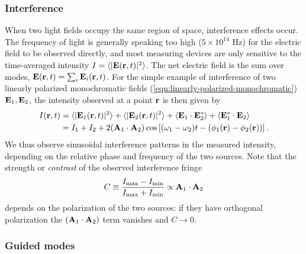 \subsubsection{Interference} 
\label{sec:interference}
When two light fields occupy the same region of space, interference effects occur. The frequency of light is generally speaking too high ($5\times10 ^{14}$ Hz) for the electric field to be observed directly, and most measuring devices are only sensitive to the time-averaged intensity $I= \langle | \mathbf{E}(\mathbf{r}, t) | ^2 \rangle$. 
The net electric field is the sum over modes, $\mathbf{E}(\mathbf{r}, t) = \sum_{i} \mathbf{E}_i(\mathbf{r}, t)$. For the simple example of interference of two linearly polarized monochromatic fields (\ref{eqn:linearly-polarized-monochromatic}) $\mathbf{E}_1, \mathbf{E}_2$, the intensity observed at a point $\mathbf{r}$ is then given by
\begin{align}
    I(\mathbf{r}, t) 
    &= 
    \langle |\mathbf{E}_1(\mathbf{r}, t)|^2 \rangle +  
    \langle |\mathbf{E}_2(\mathbf{r}, t)|^2 \rangle +
    \langle \mathbf{E}_1 \cdot \mathbf{E}_2^* \rangle +
    \langle \mathbf{E}_1^* \cdot \mathbf{E}_2 \rangle \\
    &= I_1 + I_2 + 2(\mathbf{A}_1 \cdot \mathbf{A}_2) 
    \cos \left[ (\omega_1 - \omega_2) t - (\phi_1(\mathbf{r}) - \phi_2(\mathbf{r}) ) \right].
    \label{eqn:reduced-contrast}
\end{align}
We thus observe sinusoidal interference patterns in the measured intensity, depending on the relative phase and frequency of the two sources. Note that the strength or \emph{contrast} of the observed interference fringe 
\begin{equation}
    C \equiv \frac{I_\mathrm{max} - I_\mathrm{min}}{I_\mathrm{max}+I_\mathrm{min}} \propto \mathbf{A}_1 \cdot \mathbf{A}_2
    \label{eqn:interference-contrast}
\end{equation}
depends on the polarization of the two sources: if they have orthogonal polarization the $(\mathbf{A}_1 \cdot \mathbf{A}_2)$ term vanishes and $C\rightarrow0$.


\subsubsection{Guided modes} 
\label{sec:guided-modes}

